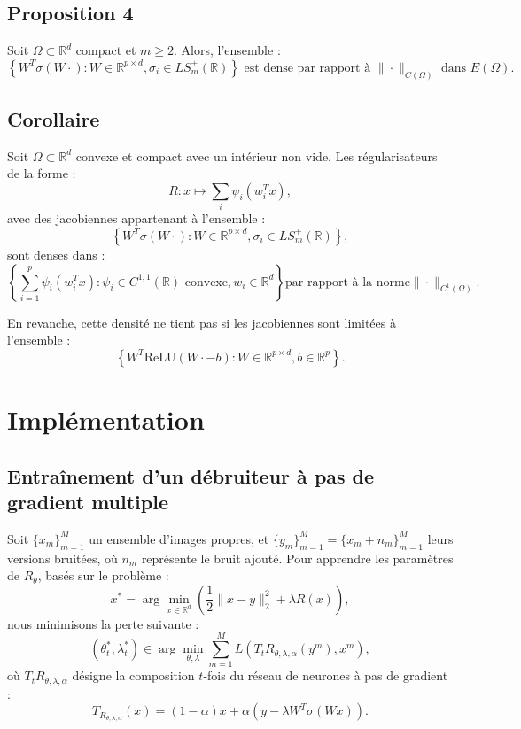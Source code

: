 \documentclass[a4paper, 12pt]{report} %
\begin{document}
\subsection*{Proposition 4}
Soit \( \Omega \subset \mathbb{R}^d \) compact et \( m \geq 2 \). Alors, l'ensemble :
\[
\left\{ W^T \sigma(W \cdot) : W \in \mathbb{R}^{p \times d}, \sigma_i \in LS_m^+(\mathbb{R}) \right\} 
\text{ est dense par rapport à } \| \cdot \|_{C(\Omega)} \text{ dans }  E(\Omega).\]

\subsection*{Corollaire}

Soit \( \Omega \subset \mathbb{R}^d \) convexe et compact avec un intérieur non vide. Les régularisateurs de la forme :
\[ R: x \mapsto \sum_{i} \psi_i(w_i^T x),\]
avec des jacobiennes appartenant à l'ensemble :
\[
\left\{ W^T \sigma(W \cdot) : W \in \mathbb{R}^{p \times d}, \sigma_i \in LS_m^+(\mathbb{R}) \right\},
\]
sont denses dans :
\[
\left\{ \sum_{i=1}^p \psi_i(w_i^T x) : \psi_i \in C^{1,1}(\mathbb{R}) \text{ convexe}, w_i \in \mathbb{R}^d \right\}
\text{par rapport à la norme}  \|\cdot\|_{{C^1}(\Omega)}.\]

En revanche, cette densité ne tient pas si les jacobiennes sont limitées à l'ensemble :
\[
\left\{ W^T \text{ReLU}(W \cdot - b) : W \in \mathbb{R}^{p \times d}, b \in \mathbb{R}^p \right\}.
\]

\section{Implémentation}

\subsection{Entraînement d'un débruiteur à pas de gradient multiple}

Soit \( \{x_m\}_{m=1}^M \) un ensemble d’images propres, et \( \{y_m\}_{m=1}^M = \{x_m + n_m\}_{m=1}^M \) leurs versions bruitées, où \( n_m \) représente le bruit ajouté. Pour apprendre les paramètres de \( R_\theta \), basés sur le problème :  
\[
x^* = \arg \min_{x \in \mathbb{R}^d} \left( \frac{1}{2} \| x - y \|_2^2 + \lambda R(x) \right),
\]
nous minimisons la perte suivante :  
\[
(\theta^*_t, \lambda^*_t) \in \arg \min_{\theta, \lambda} \sum_{m=1}^M L \left( T_t R_{\theta, \lambda, \alpha}(y^m), x^m \right),
\]
où \( T_t R_{\theta, \lambda, \alpha} \) désigne la composition \( t \)-fois du réseau de neurones à pas de gradient :  
\[
T_{R_{\theta, \lambda, \alpha}}(x) = (1 - \alpha)x + \alpha \left( y - \lambda W^T \sigma(Wx) \right).
\]
\end{document}
